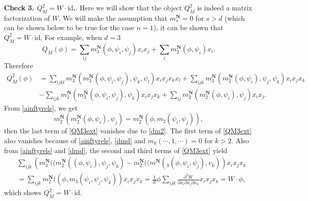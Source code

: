 \documentclass[a4paper,11pt]{article}
\numberwithin{equation}{section}
\begin{document}
{\bf Check 3. $Q_M^2 = W \cdot \mathrm{id}$.}. Here we will show that the 
object $Q_M^2$ is indeed a matrix factorization of $W$. We will make the 
assumption that $m^\mathbf{N}_s = 
0$ for $s>d$ (which can be shown below to be true for the case $n=1$), it can 
be shown that $Q_M^2 = W \cdot 
\mathrm{id}$. 
For example, when $d=3$
\[
Q_M(\phi) = \sum_{ij} m^\mathbf{N}_3(\phi,\psi_i,\psi_j)x_ix_j + \sum_i 
m_2^\mathbf{N}(\phi,\psi_i)x_i.
\]
Therefore
\begin{equation}\label{QM3ext}
\begin{split}
Q_M^2(\phi) &= \sum_{ijkl} 
m_3^\mathbf{N}(m_3^\mathbf{N}(\phi,\psi_i,\psi_j),\psi_k,\psi_l)x_ix_jx_kx_l + 
\sum_{ijk} m_3^\mathbf{N}(m_2^\mathbf{N}(\phi,\psi_i),\psi_j,\psi_k)x_ix_jx_k \\
&- \sum_{ijk} m_2^\mathbf{N}(m^\mathbf{N}_3(\phi,\psi_i,\psi_j),\psi_k)x_ix_jx_k 
+ \sum_{ij} m_2^\mathbf{N} 
(m_2^\mathbf{N}(\phi,\psi_i),\psi_j)x_ix_j.
\end{split}
\end{equation}
From \eqref{ainftyrels}, we get
\[
m^\mathbf{N}_2(m^\mathbf{N}_2(\phi,\psi_i),\psi_j) = 
m^\mathbf{N}_2(\phi,m_2(\psi_i,\psi_j)),
\]
then the last term of \eqref{QM3ext} vanishes due to \eqref{dm2}. The first 
term 
of \eqref{QM3ext} also vanishes because of \eqref{ainftyrels}, \eqref{dmd} and 
$m_k(\cdots,1,\cdots) = 0$ for $k>2$. Also from \eqref{ainftyrels} and 
\eqref{dmd}, the second and third terms of \eqref{QM3ext} yield
\[
\begin{split}
&\sum_{ijk} \left( m_3^\mathbf{N}((m_2^\mathbf{N}((\phi,\psi_i),\psi_j,\psi_k) 
- 
m_2^\mathbf{N}((m^\mathbf{N}(_3(\phi,\psi_i,\psi_j),v_k) \right)x_ix_jx_k\\
& = \sum_{ijk} m_2^\mathbf{N}((\phi,m_3(\psi_i,\psi_j,\psi_k))x_ix_jx_k = 
\frac{1}{3!} \phi 
\sum_{ijk} \frac{\partial^3 W}{\partial x_i \partial x_j \partial x_k} 
x_ix_jx_k 
= W \cdot \phi,
\end{split}
\]
which shows $Q_M^2 = W \cdot \mathrm{id}$.
\end{document}
